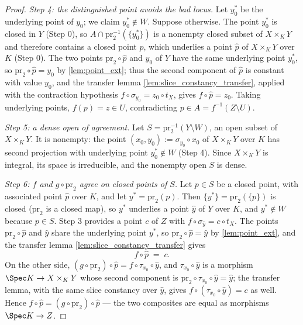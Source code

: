 \begin{proof}
  \emph{Step 4: the distinguished point avoids the bad locus.} Let \(y_0^*\) be the
  underlying point of \(y_0\); we claim \(y_0^* \notin W\). Suppose otherwise. The point
  \(y_0^*\) is closed in \(Y\) (Step 0), so
  \(A \cap \mathrm{pr}_2^{-1}(\{y_0^*\})\) is a nonempty closed subset of \(X \times_K Y\)
  and therefore contains a closed point \(p\), which underlies a point \(\hat p\) of
  \(X \times_K Y\) over \(K\) (Step 0). The two points \(\mathrm{pr}_2 \circ \hat p\) and
  \(y_0\) of \(Y\) have the same underlying point \(y_0^*\), so
  \(\mathrm{pr}_2 \circ \hat p = y_0\) by \ref{lem:point_ext}; thus the second component of
  \(\hat p\) is constant with value \(y_0\), and the transfer lemma
  \ref{lem:slice_constancy_transfer}, applied with the contraction hypothesis
  \(f \circ \sigma_{y_0} = z_0 \circ t_X\), gives \(f \circ \hat p = z_0\). Taking
  underlying points, \(f(p) = z \in U\), contradicting \(p \in A = f^{-1}(Z \setminus U)\).

  \emph{Step 5: a dense open of agreement.} Let
  \(S = \mathrm{pr}_2^{-1}(Y \setminus W)\), an open subset of \(X \times_K Y\). It is
  nonempty: the point \((x_0, y_0) := \sigma_{y_0} \circ x_0\) of \(X \times_K Y\) over
  \(K\) has second projection with underlying point \(y_0^* \notin W\) (Step 4). Since
  \(X \times_K Y\) is integral, its space is irreducible, and the nonempty open \(S\) is
  dense.

  \emph{Step 6: \(f\) and \(g \circ \mathrm{pr}_2\) agree on closed points of \(S\).} Let
  \(p \in S\) be a closed point, with associated point \(\hat p\) over \(K\), and let
  \(y^* = \mathrm{pr}_2(p)\). Then \(\{y^*\} = \mathrm{pr}_2(\{p\})\) is closed
  (\(\mathrm{pr}_2\) is a closed map), so \(y^*\) underlies a point \(\hat y\) of \(Y\) over
  \(K\), and \(y^* \notin W\) because \(p \in S\). Step 3 provides a point \(c\) of \(Z\)
  with \(f \circ \sigma_{\hat y} = c \circ t_X\). The points \(\mathrm{pr}_2 \circ \hat p\)
  and \(\hat y\) share the underlying point \(y^*\), so
  \(\mathrm{pr}_2 \circ \hat p = \hat y\) by \ref{lem:point_ext}, and the transfer lemma
  \ref{lem:slice_constancy_transfer} gives
  \[
    f \circ \hat p \;=\; c .
  \]
  On the other side, \((g \circ \mathrm{pr}_2) \circ \hat p = f \circ \tau_{x_0} \circ \hat y\),
  and \(\tau_{x_0} \circ \hat y\) is a morphism \(\Spec K \to X \times_K Y\) whose second
  component is \(\mathrm{pr}_2 \circ \tau_{x_0} \circ \hat y = \hat y\); the transfer lemma,
  with the same slice constancy over \(\hat y\), gives
  \(f \circ (\tau_{x_0} \circ \hat y) = c\) as well. Hence
  \(f \circ \hat p = (g \circ \mathrm{pr}_2) \circ \hat p\) — the two composites are equal
  as morphisms \(\Spec K \to Z\).


\end{proof}
